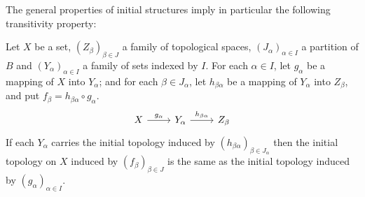 The general properties of initial structures imply in particular the following transitivity property:
\begin{proposition}
Let $X$ be a set, $(Z_\beta)_{\beta\in J}$ a family of topological spaces, $(J_\alpha)_{\alpha\in I}$ a partition of $B$ and $(Y_\alpha)_{\alpha\in I}$ a family of sets indexed by $I$. For each $\alpha\in I$, let $g_\alpha$ be a mapping of $X$ into $Y_\alpha$; and for each $\beta\in J_\alpha$, let $h_{\beta\alpha}$ be a mapping of $Y_\alpha$ into $Z_\beta$, and put $f_\beta=h_{\beta\alpha}\circ g_\alpha$. 
\[\begin{tikzcd}
X\ar[r,"g_\alpha"]&Y_\alpha\ar[r,"h_{\beta\alpha}"]&Z_\beta
\end{tikzcd}\]
If each $Y_\alpha$ carries the initial topology induced by $(h_{\beta\alpha})_{\beta\in J_\alpha}$ then the initial topology on $X$ induced by $(f_\beta)_{\beta\in J}$ is the same as the initial topology induced by $(g_\alpha)_{\alpha\in I}$.
\end{proposition}
